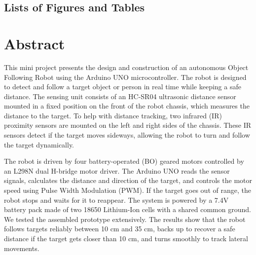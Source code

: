 \documentclass[12pt,a4paper,oneside]{report}
\begin{document}
\begin{singlespace}
\chapter*{Lists of Figures and Tables}
\vspace{0.1in}
\begingroup
\renewcommand{\clearpage}{\relax}
\makeatletter
\renewcommand{\chapter}{\@ifstar{\@chapterstar}{\@chapternostar}}
\newcommand{\@chapterstar}[1]{%
  \vspace{10pt}%
  {\normalfont\fontsize{15}{18}\selectfont\bfseries\raggedright #1}\par%
  \nopagebreak\vspace{6.0pt}%
}
\newcommand{\@chapternostar}[2][]{%
  \vspace{10pt}%
  {\normalfont\fontsize{15}{18}\selectfont\bfseries\raggedright #2}\par%
  \nopagebreak\vspace{6.0pt}%
}
\makeatother
\listoffigures
\vspace{0.3in}
\listoftables
\endgroup
\end{singlespace}
\clearpage

\chapter*{Abstract}
\vspace{0.2in}
This mini project presents the design and construction of an autonomous Object Following Robot using the Arduino UNO microcontroller. The robot is designed to detect and follow a target object or person in real time while keeping a safe distance. The sensing unit consists of an HC-SR04 ultrasonic distance sensor mounted in a fixed position on the front of the robot chassis, which measures the distance to the target. To help with distance tracking, two infrared (IR) proximity sensors are mounted on the left and right sides of the chassis. These IR sensors detect if the target moves sideways, allowing the robot to turn and follow the target dynamically.\par
\medskip
The robot is driven by four battery-operated (BO) geared motors controlled by an L298N dual H-bridge motor driver. The Arduino UNO reads the sensor signals, calculates the distance and direction of the target, and controls the motor speed using Pulse Width Modulation (PWM). If the target goes out of range, the robot stops and waits for it to reappear. The system is powered by a 7.4V battery pack made of two 18650 Lithium-Ion cells with a shared common ground. We tested the assembled prototype extensively. The results show that the robot follows targets reliably between 10 cm and 35 cm, backs up to recover a safe distance if the target gets closer than 10 cm, and turns smoothly to track lateral movements.\par
\clearpage
\end{document}
